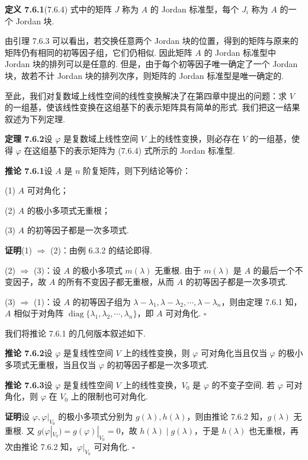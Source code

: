 \documentclass[UTF8, 12pt, fontset=fandol, oneside]{ctexart}
\begin{document}
\noindent\textbf{定义 7.6.1}\quad (7.6.4) 式中的矩阵 $J$ 称为 $A$ 的 Jordan 标准型，每个 $J_i$ 称为 $A$ 的一个 Jordan 块.

由引理 7.6.3 可以看出，若交换任意两个 Jordan 块的位置，得到的矩阵与原来的矩阵仍有相同的初等因子组，它们仍相似. 因此矩阵 $A$ 的 Jordan 标准型中 Jordan 块的排列可以是任意的. 但是，由于每个初等因子唯一确定了一个 Jordan 块，故若不计 Jordan 块的排列次序，则矩阵的 Jordan 标准型是唯一确定的.

至此，我们对复数域上线性空间的线性变换解决了在第四章中提出的问题：求 $V$ 的一组基，使该线性变换在这组基下的表示矩阵具有简单的形式. 我们把这一结果叙述为下列定理.

\noindent\textbf{定理 7.6.2}\quad 设 $\varphi$ 是复数域上线性空间 $V$ 上的线性变换，则必存在 $V$ 的一组基，使得 $\varphi$ 在这组基下的表示矩阵为 (7.6.4) 式所示的 Jordan 标准型.

\noindent\textbf{推论 7.6.1}\quad 设 $A$ 是 $n$ 阶复矩阵，则下列结论等价：

(1) $A$ 可对角化；

(2) $A$ 的极小多项式无重根；

(3) $A$ 的初等因子都是一次多项式.

\noindent\textbf{证明}\quad (1) $\Rightarrow$ (2)：由例 6.3.2 的结论即得.

(2) $\Rightarrow$ (3)：设 $A$ 的极小多项式 $m(\lambda)$ 无重根. 由于 $m(\lambda)$ 是 $A$ 的最后一个不变因子，故 $A$ 的所有不变因子都无重根，从而 $A$ 的初等因子都是一次多项式.

(3) $\Rightarrow$ (1)：设 $A$ 的初等因子组为 $\lambda-\lambda_1,\lambda-\lambda_2,\cdots,\lambda-\lambda_n$，则由定理 7.6.1 知，$A$ 相似于对角阵 $\operatorname{diag}\{\lambda_1,\lambda_2,\cdots,\lambda_n\}$，即 $A$ 可对角化. $\square$

我们将推论 7.6.1 的几何版本叙述如下.

\noindent\textbf{推论 7.6.2}\quad 设 $\varphi$ 是复线性空间 $V$ 上的线性变换，则 $\varphi$ 可对角化当且仅当 $\varphi$ 的极小多项式无重根，当且仅当 $\varphi$ 的初等因子都是一次多项式.

\noindent\textbf{推论 7.6.3}\quad 设 $\varphi$ 是复线性空间 $V$ 上的线性变换，$V_0$ 是 $\varphi$ 的不变子空间. 若 $\varphi$ 可对角化，则 $\varphi$ 在 $V_0$ 上的限制也可对角化.

\noindent\textbf{证明}\quad 设 $\varphi,\varphi|_{V_0}$ 的极小多项式分别为 $g(\lambda),h(\lambda)$，则由推论 7.6.2 知，$g(\lambda)$ 无重根. 又 $g(\varphi|_{V_0})=g(\varphi)|_{V_0}=0$，故 $h(\lambda)\mid g(\lambda)$，于是 $h(\lambda)$ 也无重根，再次由推论 7.6.2 知，$\varphi|_{V_0}$ 可对角化. $\square$
\end{document}
